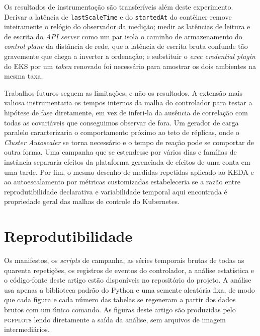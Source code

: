 \documentclass[conference]{IEEEtran}
\begin{document}
Os resultados de instrumentação são transferíveis além deste experimento. Derivar
a latência de \texttt{lastScaleTime} e do \texttt{startedAt} do contêiner remove
inteiramente o relógio do observador da medição; medir as latências de leitura e
de escrita do \emph{API server} como um par isola o caminho de armazenamento do
\emph{control plane} da distância de rede, que a latência de escrita bruta
confunde tão gravemente que chega a inverter a ordenação; e substituir o
\emph{exec credential plugin} do EKS por um \emph{token} renovado foi necessário
para amostrar os dois ambientes na mesma taxa.

Trabalhos futuros seguem as limitações, e não os resultados. A extensão mais
valiosa instrumentaria os tempos internos da malha do controlador para testar a
hipótese de fase diretamente, em vez de inferi-la da ausência de correlação com
todas as covariáveis que conseguimos observar de fora. Um gerador de carga
paralelo caracterizaria o comportamento próximo ao teto de réplicas, onde o
\emph{Cluster Autoscaler} se torna necessário e o tempo de reação pode se
comportar de outra forma. Uma campanha que se estendesse por vários dias e
famílias de instância separaria efeitos da plataforma gerenciada de efeitos de
uma conta em uma tarde. Por fim, o mesmo desenho de medidas repetidas aplicado ao
KEDA e ao autoescalamento por métricas customizadas estabeleceria se a razão
entre reprodutibilidade declarativa e variabilidade temporal aqui encontrada é
propriedade geral das malhas de controle do Kubernetes.

\section*{Reprodutibilidade}

Os manifestos, os \emph{scripts} de campanha, as séries temporais brutas de todas
as quarenta repetições, os registros de eventos do controlador, a análise
estatística e o código-fonte deste artigo estão disponíveis no repositório do
projeto. A análise usa apenas a biblioteca padrão do Python e uma semente
aleatória fixa, de modo que cada figura e cada número das tabelas se regeneram a
partir dos dados brutos com um único comando. As figuras deste artigo são
produzidas pelo \textsc{pgfplots} lendo diretamente a saída da análise, sem
arquivos de imagem intermediários.
\end{document}
